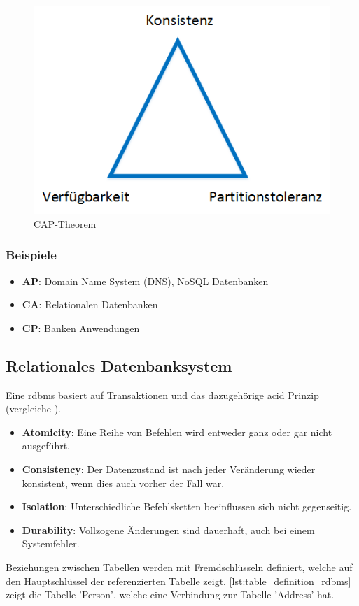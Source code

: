 \begin{figure}[h]
\centering
\includegraphics[scale=0.8]{images/visio/cap.png}
\caption[CAP-Theorem]{CAP-Theorem \selfmade{}}
\label{fig:cap}
\end{figure}

\subsubsection{Beispiele}

\begin{itemize}
	\item \textbf{AP}: Domain Name System (DNS), NoSQL Datenbanken
	\item \textbf{CA}: Relationalen Datenbanken
	\item \textbf{CP}: Banken Anwendungen
\end{itemize}

\subsection{Relationales Datenbanksystem}\label{rdbms}
Eine \gls{rdbms} basiert auf Transaktionen und das dazugehörige \gls{acid} Prinzip (vergleiche \cite{limited2010introduction}). 
\begin{itemize}
	\item \textbf{Atomicity}: Eine Reihe von Befehlen wird entweder ganz oder gar nicht ausgeführt.
	\item \textbf{Consistency}: Der Datenzustand ist nach jeder Veränderung wieder konsistent, wenn dies auch vorher der Fall war.
	\item \textbf{Isolation}: Unterschiedliche Befehlsketten beeinflussen sich nicht gegenseitig.
	\item \textbf{Durability}: Vollzogene Änderungen sind dauerhaft, auch bei einem Systemfehler.
\end{itemize}
Beziehungen zwischen Tabellen werden mit Fremdschlüsseln definiert, welche auf den Hauptschlüssel der referenzierten Tabelle zeigt. \autoref{lst:table_definition_rdbms} zeigt die
Tabelle 'Person', welche eine Verbindung zur Tabelle 'Address' hat.

